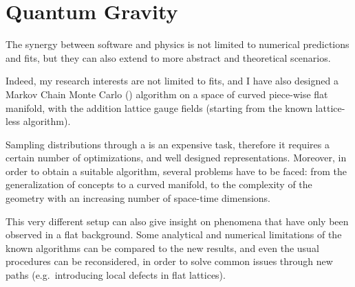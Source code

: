 \section{Quantum Gravity}

The synergy between software and physics is not limited to numerical
predictions and fits, but they can also extend to more abstract and theoretical
scenarios.

Indeed, my research interests are not limited to \pdf fits, and I have also
designed a Markov Chain Monte Carlo (\mcmc) algorithm on a space of curved
piece-wise flat manifold, with the addition lattice gauge fields (starting from
the known lattice-less algorithm).

Sampling distributions through a \mcmc is an expensive task, therefore it
requires a certain number of optimizations, and well designed representations.
Moreover, in order to obtain a suitable algorithm, several problems have to be
faced: from the generalization of \qcd concepts to a curved manifold, to the
complexity of the geometry with an increasing number of space-time dimensions.

This very different setup can also give insight on phenomena that have only
been observed in a flat background.
Some analytical and numerical limitations of the known algorithms can be
compared to the new results, and even the usual procedures can be reconsidered,
in order to solve common issues through new paths (e.g.\ introducing local
defects in flat lattices).
